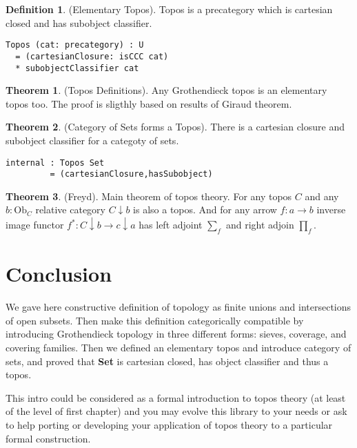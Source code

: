 \documentclass{article}
\theoremstyle{definition}
\newtheorem{definition}{Definition}
\newtheorem{theorem}{Theorem}
\begin{document}
\begin{definition} (Elementary Topos).
Topos is a precategory which is cartesian closed and has subobject classifier.
\begin{lstlisting}
Topos (cat: precategory) : U
  = (cartesianClosure: isCCC cat)
  * subobjectClassifier cat
\end{lstlisting}
\end{definition}

\begin{theorem} (Topos Definitions).
Any Grothendieck topos is an elementary topos too.
The proof is sligthly based on results of Giraud theorem.
\end{theorem}

\begin{theorem} (Category of Sets forms a Topos).
There is a cartesian closure and subobject classifier for a categoty of sets.
\begin{lstlisting}
internal : Topos Set
         = (cartesianClosure,hasSubobject)
\end{lstlisting}
\end{theorem}

\begin{theorem} (Freyd). Main theorem of topos theory\cite{Goldblatt14}.
For any topos $C$ and any $b : \mathrm{Ob}_C$ relative category $C\downarrow b$ is also a topos.
And for any arrow $f: a \rightarrow b$ inverse image functor $f^*: C\downarrow b \rightarrow c\downarrow a$
has left adjoint $\sum_f$ and right adjoin $\prod_f$.
\end{theorem}

\section*{Conclusion}

We gave here constructive definition of topology as finite unions and
intersections of open subsets. Then make this definition categorically
compatible by introducing Grothendieck topology in three different forms: sieves, coverage,
and covering families. Then we defined an elementary topos and introduce category of sets,
and proved that {\bf Set} is cartesian closed, has object classifier and thus a topos.

This intro could be considered as a formal introduction to topos theory (at least of the level of first chapter)
and you may evolve this library to your needs or ask to help porting or developing your application
of topos theory to a particular formal construction.



\end{document}
